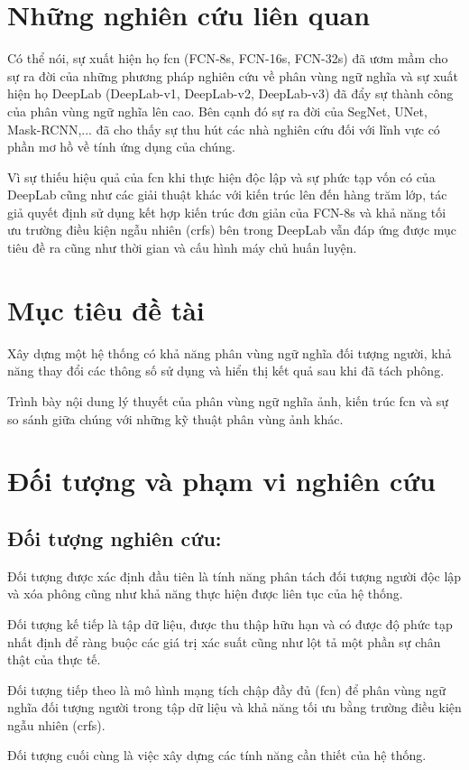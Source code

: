 \documentclass[../the.tex]{subfiles}
\begin{document}
\section{Những nghiên cứu liên quan}
\label{nhung_nghien_cuu_lien_quan}
{\fontsize{13}{12} \selectfont
Có thể nói, sự xuất hiện họ \gls{fcn} (FCN-8s, FCN-16s, FCN-32s)\cite{long_shelhamer_fcn} đã ươm mầm cho sự ra đời của những phương pháp nghiên cứu về phân vùng ngữ nghĩa và sự xuất hiện họ DeepLab (DeepLab-v1, DeepLab-v2, DeepLab-v3)\cite{DBLP:journals/pami/ChenPKMY18} đã đẩy sự thành công của phân vùng ngữ nghĩa lên cao. Bên cạnh đó sự ra đời của SegNet\cite{DBLP:journals/corr/BadrinarayananK15}, UNet\cite{DBLP:journals/corr/RonnebergerFB15}, Mask-RCNN\cite{DBLP:journals/corr/HeGDG17},... đã cho thấy sự thu hút các nhà nghiên cứu đối với lĩnh vực có phần mơ hồ về tính ứng dụng của chúng.  

	Vì sự thiếu hiệu quả của \gls{fcn} khi thực hiện độc lập và sự phức tạp vốn có của DeepLab cũng như các giải thuật khác với kiến trúc lên đến hàng trăm lớp, tác giả quyết định sử dụng kết hợp kiến trúc đơn giản của FCN-8s và khả năng tối ưu trường điều kiện ngẫu nhiên (\gls{crfs}) bên trong DeepLab vẫn đáp ứng được mục tiêu đề ra cũng như thời gian và cấu hình máy chủ huấn luyện.}
	
\section{Mục tiêu đề tài}
\label{muc_tieu_de_tai}
{\fontsize{13}{12} \selectfont
Xây dựng một hệ thống có khả năng phân vùng ngữ nghĩa đối tượng người, khả năng thay đổi các thông số sử dụng và hiển thị kết quả sau khi đã tách phông.

	Trình bày nội dung lý thuyết của phân vùng ngữ nghĩa ảnh, kiến trúc \gls{fcn} và sự so sánh giữa chúng với những kỹ thuật phân vùng ảnh khác.}



\section{Đối tượng và phạm vi nghiên cứu}
\label{doi_tuong_pvnc}
\subsection{Đối tượng nghiên cứu:}
\label{doi_tuong}
{\fontsize{13}{12} \selectfont
Đối tượng được xác định đầu tiên là tính năng phân tách đối tượng người độc lập và xóa phông cũng như khả năng thực hiện được liên tục của hệ thống.  

	Đối tượng kế tiếp là tập dữ liệu, được thu thập hữu hạn và có được độ phức tạp nhất định để ràng buộc các giá trị xác suất cũng như lột tả một phần sự chân thật của thực tế.
	
	Đối tượng tiếp theo là mô hình mạng tích chập đầy đủ (\gls{fcn}) để phân vùng ngữ nghĩa đối tượng người trong tập dữ liệu và khả năng tối ưu bằng trường điều kiện ngẫu nhiên (\gls{crfs}).
	
	Đối tượng cuối cùng là việc xây dựng các tính năng cần thiết của hệ thống.}
\end{document}
